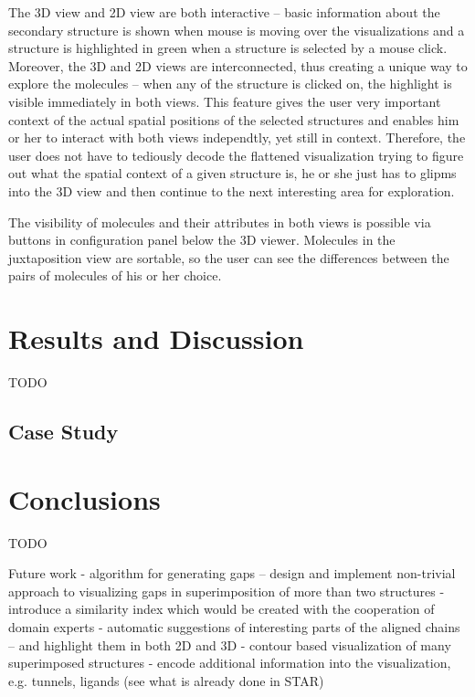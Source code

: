 \documentclass[twocolumn]{bmcart}%
\begin{document}
The 3D view and 2D view are both interactive -- basic information about the secondary structure is shown when mouse is moving over the visualizations and a structure is highlighted in green when a structure is selected by a mouse click. Moreover, the 3D and 2D views are interconnected, thus creating a unique way to explore the molecules -- when any of the structure is clicked on, the highlight is visible immediately in both views. This feature gives the user very important context of the actual spatial positions of the selected structures and enables him or her to interact with both views independtly, yet still in context. Therefore, the user does not have to tediously decode the flattened visualization trying to figure out what the spatial context of a given structure is, he or she just has to glipms into the 3D view and then continue to the next interesting area for exploration.

The visibility of molecules and their attributes in both views is possible via buttons in configuration panel below the 3D viewer. Molecules in the juxtaposition view are sortable, so the user can see the differences between the pairs of molecules of his or her choice.



\section*{Results and Discussion}
TODO

\subsection*{Case Study}

\section*{Conclusions}
TODO

Future work
- algorithm for generating gaps -- design and implement non-trivial approach to visualizing gaps in superimposition of more than two structures
- introduce a similarity index which would be created with the cooperation of domain experts
- automatic suggestions of interesting parts of the aligned chains -- and highlight them in both 2D and 3D
- contour based visualization of many superimposed structures
- encode additional information into the visualization, e.g. tunnels, ligands (see what is already done in STAR)
\end{document}
